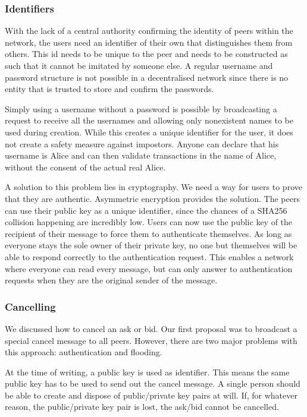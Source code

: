 \subsubsection{Identifiers}
\label{sprint1:identifiers}
With the lack of a central authority confirming the identity of peers within the network, the users need an identifier of their own that distinguishes them from others.
This id needs to be unique to the peer and needs to be constructed as such that it cannot be imitated by someone else.
A regular username and password structure is not possible in a decentralised network since there is no entity that is trusted to store and confirm the passwords.


Simply using a username without a password is possible by broadcasting a request to receive all the usernames and allowing only nonexistent names to be used during creation.
While this creates a unique identifier for the user, it does not create a safety measure against impostors.
Anyone can declare that his username is Alice and can then validate transactions in the name of Alice, without the consent of the actual real Alice.

A solution to this problem lies in cryptography.
We need a way for users to prove that they are authentic.
Asymmetric encryption provides the solution.
The peers can use their public key as a unique identifier, since the chances of a SHA256 collision happening are incredibly low.
Users can now use the public key of the recipient of their message to force them to authenticate themselves.
As long as everyone stays the sole owner of their private key, no one but themselves will be able to respond correctly to the authentication request.
This enables a network where everyone can read every message, but can only answer to authentication requests when they are the original sender of the message.


\subsubsection{Cancelling}
\label{sprint1:cancelling}
We discussed how to cancel an ask or bid.
Our first proposal was to broadcast a special cancel message to all peers.
However, there are two major problems with this approach: authentication and flooding.


At the time of writing, a public key is used as identifier.
This means the same public key has to be used to send out the cancel message.
A single person should be able to create and dispose of public/private key pairs at will.
If, for whatever reason, the public/private key pair is lost, the ask/bid cannot be cancelled.


